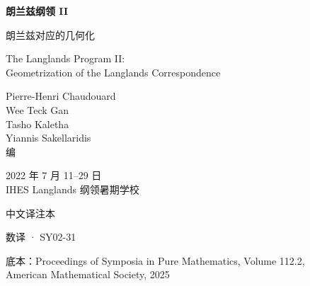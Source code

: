 



\begin{titlepage}
\centering
\vspace*{3.2cm}
{\Huge\bfseries 朗兰兹纲领 II\par}
\vspace{0.6cm}
{\LARGE 朗兰兹对应的几何化\par}
\vspace{1.2cm}
{\large The Langlands Program II:\\[0.15em]
Geometrization of the Langlands Correspondence\par}
\vspace{1.6cm}
{\large Pierre-Henri Chaudouard\\[0.2em]
Wee Teck Gan\\[0.2em]
Tasho Kaletha\\[0.2em]
Yiannis Sakellaridis\\ 编\par}
\vspace{1.2cm}
{\large 2022 年 7 月 11–29 日\\ IHES Langlands 纲领暑期学校\par}
\vspace{1.6cm}
{\large 中文译注本\par}
\vspace{0.4cm}
{\large 数译 · SY02-31\par}
\vfill
{\small 底本：Proceedings of Symposia in Pure Mathematics, Volume 112.2,\\
American Mathematical Society, 2025\par}
\end{titlepage}

\frontmatter
\pagestyle{fancy}
\tableofcontents





\mainmatter



















